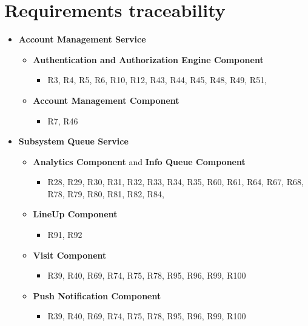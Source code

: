 \section{Requirements traceability}
\label{sect:requirementstrceability}
\begin{itemize}
    \item \textbf{Account Management Service}
        \begin{itemize}
            \item \textbf{Authentication and Authorization Engine Component}
                \begin{itemize}
                    \item R3, R4, R5, R6, R10, R12, R43, R44, R45, R48, R49, R51,
                \end{itemize}
            \item \textbf{Account Management Component}
                \begin{itemize}
                    \item R7, R46
                \end{itemize}
        \end{itemize}
    \item \textbf{Subsystem Queue Service}
        \begin{itemize}
             \item \textbf{Analytics Component} and \textbf{Info Queue Component} 
                \begin{itemize}
                     \item R28, R29, R30, R31, R32, R33, R34, R35, R60, R61, R64, R67, R68, R78, R79, R80, R81, R82, R84,
                \end{itemize}
            \item \textbf{LineUp  Component} 
                \begin{itemize}
                          \item R91, R92
                \end{itemize}
            \item \textbf{Visit  Component} 
                \begin{itemize}
                         \item R39, R40, R69, R74, R75, R78, R95, R96, R99, R100
                \end{itemize}
                \item \textbf{Push Notification  Component} 
                \begin{itemize}
                         \item R39, R40, R69, R74, R75, R78, R95, R96, R99, R100

\end{itemize}
\end{itemize}
\end{itemize}
